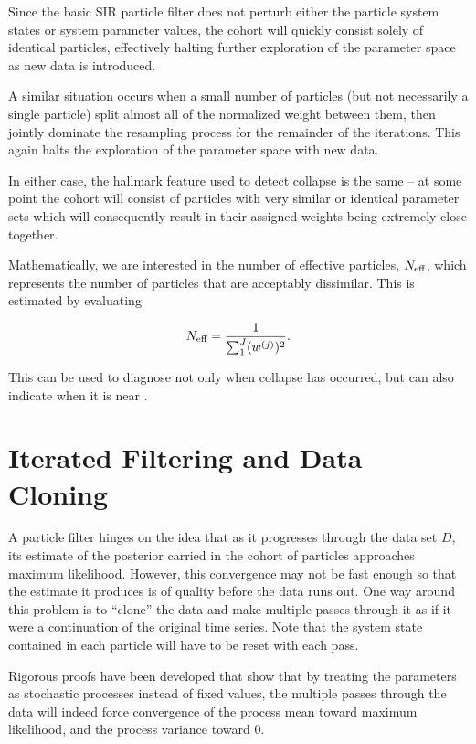 	Since the basic SIR particle filter does not perturb either the particle system states or system parameter values, the cohort will quickly consist solely of identical particles, effectively halting further exploration of the parameter space as new data is introduced.

	A similar situation occurs when a small number of particles (but not necessarily a single particle) split almost all of the normalized weight between them, then jointly dominate the resampling process for the remainder of the iterations. This again halts the exploration of the parameter space with new data.

	In either case, the hallmark feature used to detect collapse is the same -- at some point the cohort will consist of particles with very similar or identical parameter sets which will consequently result in their assigned weights being extremely close together.

	Mathematically, we are interested in the number of effective particles, $N_{\small\text{eff}}$, which represents the number of particles that are acceptably dissimilar. This is estimated by evaluating

	\begin{equation}
		N_{\small\text{eff}} = \frac{1}{\sum_1^J (w^{(j)})^2}.
	\end{equation}

	This can be used to diagnose not only when collapse has occurred, but can also indicate when it is near \cite{Arulampalam2002}.


\section{Iterated Filtering and Data Cloning}

	A particle filter hinges on the idea that as it progresses through the data set $D$, its estimate of the posterior carried in the cohort of particles approaches maximum likelihood. However, this convergence may not be fast enough so that the estimate it produces is of quality before the data runs out. One way around this problem is to ``clone'' the data and make multiple passes through it as if it were a continuation of the original time series. Note that the system state contained in each particle will have to be reset with each pass.

	Rigorous proofs have been developed \cite{Ionides2006}\cite{Ionides2015} that show that by treating the parameters as stochastic processes instead of fixed values, the multiple passes through the data will indeed force convergence of the process mean toward maximum likelihood, and the process variance toward 0.


